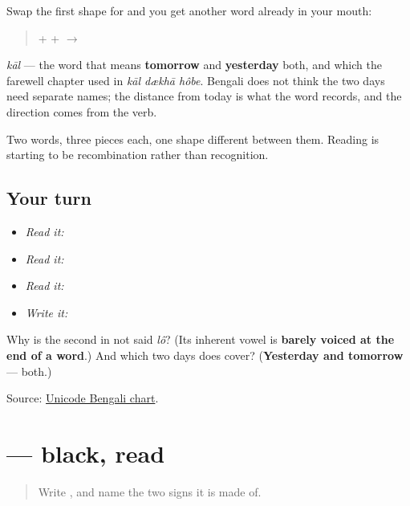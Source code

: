 Swap the first shape for \textbf{} and you get another word already in your mouth:

\begin{quote}
\textbf{} + \textbf{} + \textbf{} $\to$ \textbf{}
\end{quote}

\emph{kāl} — the word that means \textbf{tomorrow} and \textbf{yesterday} both, and which the farewell chapter used in \emph{kāl dækhā hôbe}. Bengali does not think the two days need separate names; the distance from today is what the word records, and the direction comes from the verb.

Two words, three pieces each, one shape different between them. Reading is starting to be recombination rather than recognition.

\subsection*{Your turn}
\begin{itemize}
\raggedright
  \item \emph{Read it:} 
  \item \emph{Read it:} 
  \item \emph{Read it:} 
  \item \emph{Write it:} 
\end{itemize}

\begin{tcolorbox}[breakable,colback=teal!4,colframe=teal!35!black,title={Before you move on}]
Why is the second \textbf{} in \textbf{} not said \emph{lô}? (Its inherent vowel is \textbf{barely voiced at the end of a word}.) And which two days does \textbf{} cover? (\textbf{Yesterday and tomorrow} — both.)

Source: \href{https://www.unicode.org/charts/PDF/U0980.pdf}{Unicode Bengali chart}.
\end{tcolorbox}
\section[\texorpdfstring{\bn{কালো} (kālo)}{কালো (kālo)}]{ — black, read}

\label{lesson:BN-W03-kalo-read}



\begin{quote}
Write \textbf{}, and name the two signs it is made of.
\end{quote}

